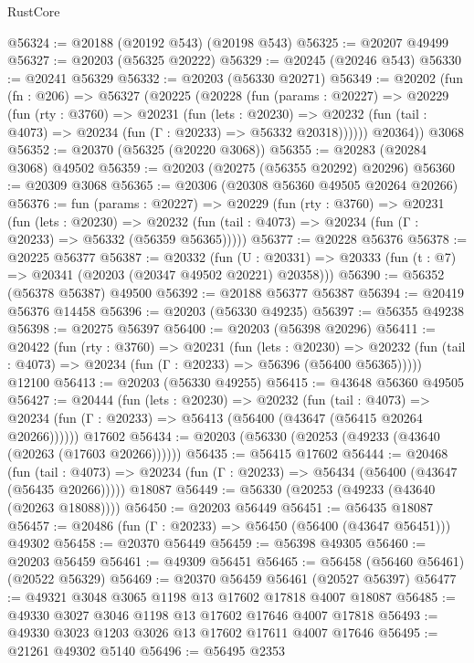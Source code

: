 \begin{lexlean}{RustCore}
\begin{coremodule}
@56324 := @20188 (@20192 @543) (@20198 @543)
@56325 := @20207 @49499
@56327 := @20203 (@56325 @20222)
@56329 := @20245 (@20246 @543)
@56330 := @20241 @56329
@56332 := @20203 (@56330 @20271)
@56349 := @20202
    (fun (fn : @206) =>
    @56327
      (@20225
        (@20228
          (fun (params : @20227) =>
          @20229
            (fun (rty : @3760) =>
            @20231
              (fun (lets : @20230) =>
              @20232 (fun (tail : @4073) => @20234 (fun (Γ : @20233) => @56332 @20318))))))
        @20364))
    @3068
@56352 := @20370 (@56325 (@20220 @3068))
@56355 := @20283 (@20284 @3068) @49502
@56359 := @20203 (@20275 (@56355 @20292) @20296)
@56360 := @20309 @3068
@56365 := @20306 (@20308 @56360 @49505 @20264 @20266)
@56376 := fun (params : @20227) =>
  @20229
    (fun (rty : @3760) =>
    @20231
      (fun (lets : @20230) =>
      @20232 (fun (tail : @4073) => @20234 (fun (Γ : @20233) => @56332 (@56359 @56365)))))
@56377 := @20228 @56376
@56378 := @20225 @56377
@56387 := @20332
    (fun (U : @20331) => @20333 (fun (t : @7) => @20341 (@20203 (@20347 @49502 @20221) @20358)))
@56390 := @56352 (@56378 @56387) @49500
@56392 := @20188 @56377 @56387
@56394 := @20419 @56376 @14458
@56396 := @20203 (@56330 @49235)
@56397 := @56355 @49238
@56398 := @20275 @56397
@56400 := @20203 (@56398 @20296)
@56411 := @20422
    (fun (rty : @3760) =>
    @20231
      (fun (lets : @20230) =>
      @20232 (fun (tail : @4073) => @20234 (fun (Γ : @20233) => @56396 (@56400 @56365)))))
    @12100
@56413 := @20203 (@56330 @49255)
@56415 := @43648 @56360 @49505
@56427 := @20444
    (fun (lets : @20230) =>
    @20232
      (fun (tail : @4073) =>
      @20234 (fun (Γ : @20233) => @56413 (@56400 (@43647 (@56415 @20264 @20266))))))
    @17602
@56434 := @20203 (@56330 (@20253 (@49233 (@43640 (@20263 (@17603 @20266))))))
@56435 := @56415 @17602
@56444 := @20468
    (fun (tail : @4073) => @20234 (fun (Γ : @20233) => @56434 (@56400 (@43647 (@56435 @20266)))))
    @18087
@56449 := @56330 (@20253 (@49233 (@43640 (@20263 @18088))))
@56450 := @20203 @56449
@56451 := @56435 @18087
@56457 := @20486 (fun (Γ : @20233) => @56450 (@56400 (@43647 @56451))) @49302
@56458 := @20370 @56449
@56459 := @56398 @49305
@56460 := @20203 @56459
@56461 := @49309 @56451
@56465 := @56458 (@56460 @56461) (@20522 @56329)
@56469 := @20370 @56459 @56461 (@20527 @56397)
@56477 := @49321 @3048 @3065 @1198 @13 @17602 @17818 @4007 @18087
@56485 := @49330 @3027 @3046 @1198 @13 @17602 @17646 @4007 @17818
@56493 := @49330 @3023 @1203 @3026 @13 @17602 @17611 @4007 @17646
@56495 := @21261 @49302 @5140
@56496 := @56495 @2353

\end{coremodule}
\end{lexlean}
